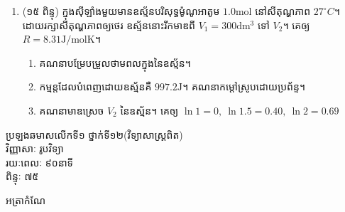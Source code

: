 \documentclass{classes/exam}
\begin{document}
\begin{enumerate}[I]
		\begin{enumerate}[k]
			\item គណនាកម្មន្តមេកានិចដែលផ្តល់ដោយពិស្តុង។
			\item តើកម្តៅដែលបញ្ចេញទៅក្នុងបរិយាកាសមានតម្លៃប៉ុន្មាន?
			\item ទិន្នផលគ្រឿងបញ្ចូនគឺ $0.85$។
			គណនាកម្មន្តដែលបញ្ចូនដោយភ្លៅម៉ូទ័រ។
		\end{enumerate}
		\item {\color{magenta}\ks (១៥ ពិន្ទុ)} ក្នុងស៊ីឡាំងមួយមានឧស្ម័នបរិសុទ្ធម៉ូណូអាតូម $1.0\si{\mole}$ នៅសីតុណ្ហភាព $27^\circ C$។ ដោយរក្សាសីតុណ្ហភាពឲ្យថេរ ឧស្ម័ននោះរីកមាឌពី $V_{1}=300\si{\deci\metre^{3}}$ ទៅ $V_{2}$។ គេឲ្យ $R=8.31\si{\joule/\mole\kelvin}$។
		\begin{enumerate}[k]
			\item គណនាបម្រែបម្រួលថាមពលក្នុងនៃឧស្ម័ន។ 
			\item កម្មន្តដែលបំពេញដោយឧស្ម័នគឺ $997.2\si{\joule}$។ គណនាកម្តៅស្រូបដោយប្រព័ន្ទ។
			\item គណនាមាឌស្រេច $V_{2}$ នៃឧស្ម័ន។ គេឲ្យ $\ln1=0,~\ln1.5=0.40,~\ln2=0.69$
		\end{enumerate}
	\end{enumerate}
\newpage
\begin{center}
	{\kml ប្រឡងឆមាសលើកទី១ ថ្នាក់ទី១២(វិទ្យាសាស្ត្រពិត)\\
		វិញ្ញាសាៈ រូបវិទ្យា\\
		រយៈពេលៈ ៩០នាទី\\
		ពិន្ទុៈ ៧៥}
\end{center}
{\kml អត្រាកំណែ}
\end{document}
